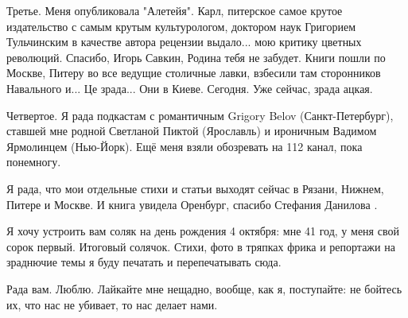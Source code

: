 Третье. Меня опубликовала "Алетейя". Карл, питерское самое крутое издательство
с самым крутым культурологом, доктором наук Григорием Тульчинским в качестве
автора рецензии выдало... мою критику цветных революций. Спасибо, Игорь Савкин,
Родина тебя не забудет. Книги пошли по Москве, Питеру во все ведущие столичные
лавки, взбесили там сторонников Навального и... Це зрада... Они в Киеве.
Сегодня. Уже сейчас, зрада ацкая.

Четвертое. Я рада подкастам с романтичным Grigory Belov (Санкт-Петербург),
ставшей мне родной Светланой Пиктой (Ярославль) и ироничным Вадимом Ярмолинцем
(Нью-Йорк). Ещё меня взяли обозревать на 112 канал, пока понемногу. 

Я рада, что мои отдельные стихи и статьи выходят сейчас в Рязани, Нижнем,
Питере и Москве. И книга увидела Оренбург, спасибо Стефания Данилова .

Я хочу устроить вам соляк на день рождения 4 октября: мне 41 год, у меня свой
сорок первый. Итоговый солячок. Стихи, фото в тряпках  фрика и репортажи на
зраднючие темы  я буду печатать и перепечатывать сюда. 

Рада вам. Люблю. Лайкайте мне нещадно, вообще, как я, поступайте: не бойтесь
их, что нас не убивает, то нас делает нами.

